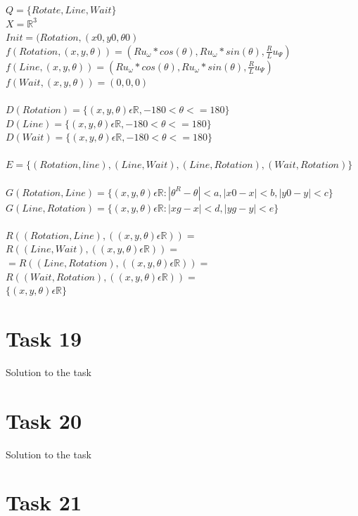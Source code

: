 \documentclass[a4paper,12pt,oneside,onecolumn]{article} %
\begin{document}
	$Q = \{Rotate,Line,Wait\}$\\
	$X = \mathbb{R}^3$\\
	$Init = (Rotation,(x0,y0,\theta0)$
	\\
	$f(Rotation,(x,y,\theta)) = (Ru_\omega*cos(\theta),Ru_\omega*sin(\theta),\frac{R}{L}u_\Psi)$\\
	$f(Line,(x,y,\theta)) = (Ru_\omega*cos(\theta),Ru_\omega*sin(\theta),\frac{R}{L}u_\Psi)$\\
	$f(Wait,(x,y,\theta)) = (0,0,0)$\\
	\\
	$D(Rotation) = \{(x,y,\theta) \epsilon \mathbb{R}, -180 < \theta <= 180\}$\\
	$D(Line) = \{(x,y,\theta) \epsilon \mathbb{R}, -180 < \theta <= 180\}$\\
	$D(Wait) = \{(x,y,\theta) \epsilon \mathbb{R}, -180 < \theta <= 180\}$\\
	\\
	$E = \{ (Rotation,line),(Line,Wait),(Line,Rotation),(Wait,Rotation)\}$\\\\
	$G(Rotation, Line) = \{(x,y,\theta) \epsilon \mathbb{R}: |\theta^R - \theta| < a, |x0 - x| < b, |y0 -y| < c\}$\\
	$G(Line, Rotation)=\{(x,y,\theta) \epsilon \mathbb{R}: |xg - x|<d,|yg -y|<e\}$\\\\	
	$R((Rotation, Line), ((x,y,\theta) \epsilon \mathbb{R}))=$ 
	$R((Line, Wait), ((x,y,\theta) \epsilon \mathbb{R}))=$\\
	$=R((Line, Rotation), ((x,y,\theta) \epsilon \mathbb{R}))=$
	$R((Wait, Rotation), ((x,y,\theta) \epsilon \mathbb{R}))=$\\$\{(x,y,\theta) \epsilon \mathbb{R}\}$\\


\section*{Task 19}

Solution to the task

\section*{Task 20}

Solution to the task

\section*{Task 21}
\end{document}
